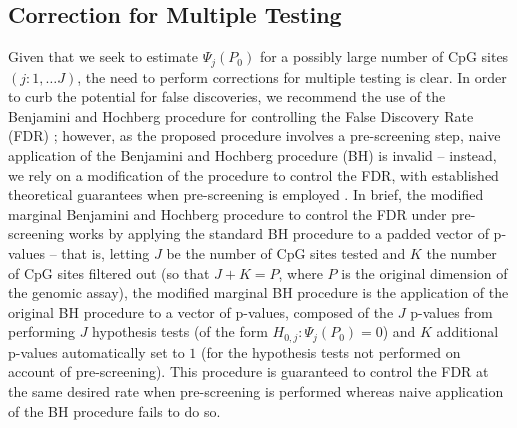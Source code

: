 \documentclass[9pt,a4paper,]{extarticle}
\theoremstyle{definition}
\theoremstyle{definition}
\theoremstyle{definition}
\theoremstyle{remark}
\begin{document}
\hypertarget{correction-for-multiple-testing}{%
\subsection{Correction for Multiple Testing}\label{correction-for-multiple-testing}}

Given that we seek to estimate \(\Psi_j(P_0)\) for a possibly large number of CpG
sites \((j: 1, \ldots J)\), the need to perform corrections for multiple testing
is clear. In order to curb the potential for false discoveries, we recommend the
use of the Benjamini and Hochberg procedure for controlling the False Discovery
Rate (FDR) \citep{benjamini1995controlling}; however, as the proposed procedure
involves a pre-screening step, naive application of the Benjamini and Hochberg
procedure (BH) is invalid -- instead, we rely on a modification of the procedure
to control the FDR, with established theoretical guarantees when pre-screening
is employed \citep{tuglus2009modified}. In brief, the modified marginal Benjamini and
Hochberg procedure to control the FDR under pre-screening works by applying the
standard BH procedure to a padded vector of p-values -- that is, letting \(J\) be
the number of CpG sites tested and \(K\) the number of CpG sites filtered out (so
that \(J + K = P\), where \(P\) is the original dimension of the genomic assay), the
modified marginal BH procedure is the application of the original BH procedure
to a vector of p-values, composed of the \(J\) p-values from performing \(J\)
hypothesis tests (of the form \(H_{0, j}: \Psi_j(P_0) = 0\)) and \(K\) additional
p-values automatically set to \(1\) (for the hypothesis tests not performed on
account of pre-screening). This procedure is guaranteed to control the FDR at
the same desired rate when pre-screening is performed whereas naive application
of the BH procedure fails to do so.

\renewcommand\refname{References}
{\small}
\end{document}
